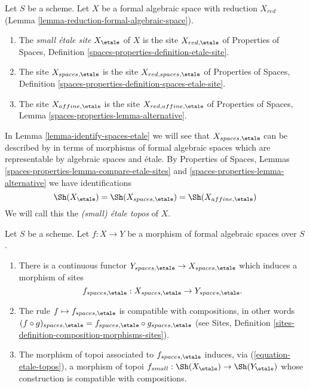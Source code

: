 \begin{definition}
\label{definition-etale-sites}
Let $S$ be a scheme. Let $X$ be a formal algebraic space with
reduction $X_{red}$ (Lemma \ref{lemma-reduction-formal-algebraic-space}).
\begin{enumerate}
\item The {\it small \'etale site} $X_\etale$ of $X$ is
the site $X_{red, \etale}$ of Properties of Spaces, Definition
\ref{spaces-properties-definition-etale-site}.
\item The site $X_{spaces, \etale}$ is the site
$X_{red, spaces, \etale}$ of Properties of Spaces, Definition
\ref{spaces-properties-definition-spaces-etale-site}.
\item The site $X_{affine, \etale}$ is the site
$X_{red, affine, \etale}$ of Properties of Spaces, Lemma
\ref{spaces-properties-lemma-alternative}.
\end{enumerate}
\end{definition}

\noindent
In Lemma \ref{lemma-identify-spaces-etale} we will see that
$X_{spaces, \etale}$ can be described by in terms of
morphisms of formal algebraic spaces which are representable
by algebraic spaces and \'etale.
By Properties of Spaces, Lemmas
\ref{spaces-properties-lemma-compare-etale-sites} and
\ref{spaces-properties-lemma-alternative}
we have identifications
\begin{equation}
\label{equation-etale-topos}
\Sh(X_\etale) = \Sh(X_{spaces, \etale}) = \Sh(X_{affine, \etale})
\end{equation}
We will call this the {\it (small) \'etale topos} of $X$.

\begin{lemma}
\label{lemma-functoriality-etale-site}
Let $S$ be a scheme.
Let $f : X \to Y$ be a morphism of formal algebraic spaces over $S$.
\begin{enumerate}
\item There is a continuous functor
$Y_{spaces, \etale} \to X_{spaces, \etale}$
which induces a morphism of sites
$$
f_{spaces, \etale} : X_{spaces, \etale} \to Y_{spaces, \etale}.
$$
\item The rule $f \mapsto f_{spaces, \etale}$ is compatible with
compositions, in other words $(f \circ g)_{spaces, \etale}
= f_{spaces, \etale} \circ g_{spaces, \etale}$ (see
Sites, Definition \ref{sites-definition-composition-morphisms-sites}).
\item The morphism of topoi associated to $f_{spaces, \etale}$
induces, via (\ref{equation-etale-topos}), a morphism of topoi
$f_{small} : \Sh(X_\etale) \to \Sh(Y_\etale)$
whose construction is compatible with compositions.
\end{enumerate}
\end{lemma}

